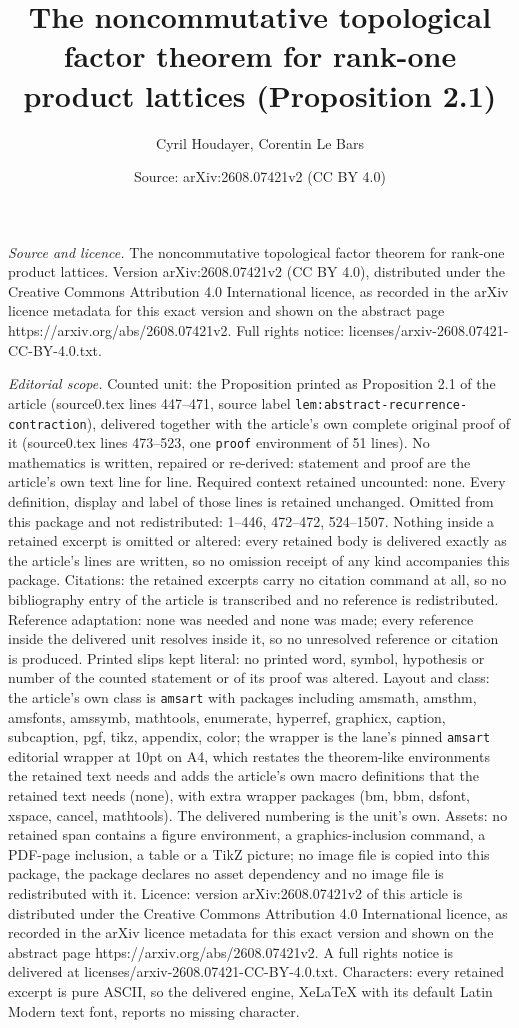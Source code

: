 \documentclass[10pt,a4paper]{amsart}
\title[The noncommutative topological factor theorem for rank-one p]{The noncommutative topological factor theorem for rank-one product lattices (Proposition 2.1)}
\author{Cyril Houdayer, Corentin Le Bars}
\date{Source: arXiv:2608.07421v2 (CC BY 4.0)}
\begin{document}
\maketitle

\noindent\emph{Source and licence.} The noncommutative topological factor theorem for rank-one product lattices. Version arXiv:2608.07421v2 (CC BY 4.0), distributed under the Creative Commons Attribution 4.0 International licence, as recorded in the arXiv licence metadata for this exact version and shown on the abstract page https://arxiv.org/abs/2608.07421v2. Full rights notice: licenses/arxiv-2608.07421-CC-BY-4.0.txt.\par\smallskip

\noindent\textit{Editorial scope.} Counted unit: the Proposition printed as Proposition 2.1 of the article (source0.tex lines 447--471, source label \texttt{lem:abstract-recurrence-contraction}), delivered together with the article's own complete original proof of it (source0.tex lines 473--523, one \texttt{proof} environment of 51 lines). No mathematics is written, repaired or re-derived: statement and proof are the article's own text line for line. Required context retained uncounted: none. Every definition, display and label of those lines is retained unchanged. Omitted from this package and not redistributed: 1--446, 472--472, 524--1507. Nothing inside a retained excerpt is omitted or altered: every retained body is delivered exactly as the article's lines are written, so no omission receipt of any kind accompanies this package. Citations: the retained excerpts carry no citation command at all, so no bibliography entry of the article is transcribed and no reference is redistributed. Reference adaptation: none was needed and none was made; every reference inside the delivered unit resolves inside it, so no unresolved reference or citation is produced. Printed slips kept literal: no printed word, symbol, hypothesis or number of the counted statement or of its proof was altered. Layout and class: the article's own class is \texttt{amsart} with packages including amsmath, amsthm, amsfonts, amssymb, mathtools, enumerate, hyperref, graphicx, caption, subcaption, pgf, tikz, appendix, color; the wrapper is the lane's pinned \texttt{amsart} editorial wrapper at 10pt on A4, which restates the theorem-like environments the retained text needs and adds the article's own macro definitions that the retained text needs (none), with extra wrapper packages (bm, bbm, dsfont, xspace, cancel, mathtools). The delivered numbering is the unit's own. Assets: no retained span contains a figure environment, a graphics-inclusion command, a PDF-page inclusion, a table or a TikZ picture; no image file is copied into this package, the package declares no asset dependency and no image file is redistributed with it. Licence: version arXiv:2608.07421v2 of this article is distributed under the Creative Commons Attribution 4.0 International licence, as recorded in the arXiv licence metadata for this exact version and shown on the abstract page https://arxiv.org/abs/2608.07421v2. A full rights notice is delivered at licenses/arxiv-2608.07421-CC-BY-4.0.txt. Characters: every retained excerpt is pure ASCII, so the delivered engine, XeLaTeX with its default Latin Modern text font, reports no missing character.
\end{document}
